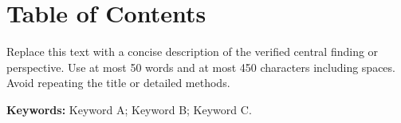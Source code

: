 \documentclass[serif,twocolumn]{prism-wiley-article}
\begin{document}



\clearpage
\onecolumn
\section*{Table of Contents}
\begin{center}
\begingroup
\setlength{\fboxsep}{0pt}
\endgroup
\end{center}
Replace this text with a concise description of the verified central
finding or perspective. Use at most 50 words and at most 450 characters
including spaces. Avoid repeating the title or detailed methods.

\medskip
\noindent\textbf{Keywords:} Keyword A; Keyword B; Keyword C.
\end{document}
